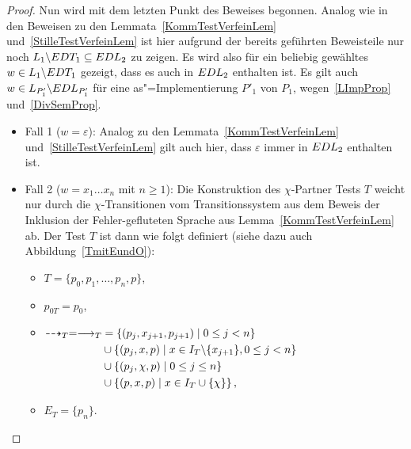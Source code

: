 \begin{proof}
  Nun wird mit dem letzten Punkt des Beweises begonnen. Analog wie in den
  Beweisen zu den Lemmata~\ref{KommTestVerfeinLem} und~\ref{StilleTestVerfeinLem}
  ist hier aufgrund der bereits geführten Beweisteile nur noch $L_1\backslash
  EDT _1 \subseteq EDL _2$ zu zeigen. Es wird also für ein beliebig gewähltes
  $w\in L_1\backslash EDT _1$ gezeigt, dass es auch in $EDL _2$ enthalten
  ist. Es gilt auch $w\in L _{P'_1}\backslash EDL _{P'_1}$ für eine
  as"=Implementierung $P'_1$ von $P_1$, wegen~\ref{LImpProp}
  und~\ref{DivSemProp}.
  \begin{itemize}
    \item Fall 1 ($w = \varepsilon$): Analog zu den
      Lemmata~\ref{KommTestVerfeinLem} und~\ref{StilleTestVerfeinLem} gilt auch
      hier, dass $\varepsilon$ immer in $EDL _2$ enthalten ist.
    \item Fall 2 ($w = x_1\dots x_n$ mit $n \geq 1$): Die Konstruktion des
      $\chi$-Partner Tests $T$ weicht nur durch die $\chi$-Transitionen vom
      Transitionssystem aus dem Beweis der Inklusion der Fehler-gefluteten
      Sprache \EL{} aus Lemma~\ref{KommTestVerfeinLem} ab. Der Test $T$ ist
      dann wie folgt definiert (siehe dazu auch Abbildung~\ref{TmitEundO}):
      \begin{itemize}
        \item $T=\{p_0,p_1,\dots ,p_n,p\}$,
        \item $p_{0T}=p_0$,
        \item $\begin{aligned}[t]
            \may _T = \must _T &= \left\{(p_j,x_{j+1},p_{j+1})\mid 0\leq j<
            n\right\}\\
            &\cup\left\{(p_j,x,p)\mid x\in I_T\backslash\{x_{j+1}\},0\leq j <
            n\right\}\\
            &\cup\left\{(p_j,\chi ,p)\mid 0\leq j\leq n\right\}\\
            &\cup\left\{(p,x ,p)\mid x\in I_T\cup \{\chi\}\right\},
        \end{aligned}$
        \item $E_T=\{p_n\}$.
      \end{itemize}
      \begin{figure} [h!tbp]
      \begin{center}
\end{center}
\end{figure}
\end{itemize}
\end{proof}
